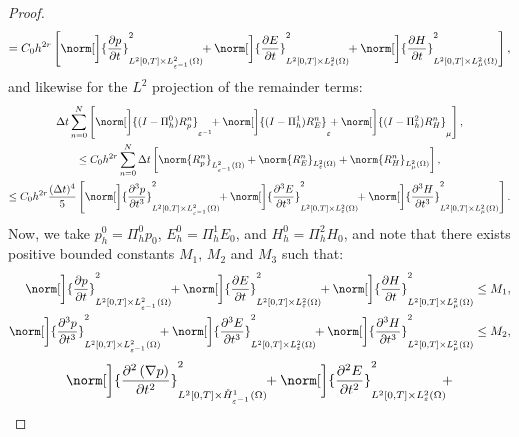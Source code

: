 \documentclass{amsart}
\theoremstyle{thmstyleone}%
\theoremstyle{thmstyletwo}%
\theoremstyle{thmstylethree}%
\begin{document}
\begin{proof}
\begin{multline*}
= C_0 h^{2 r} \left[ \norm[\bigg]{\dfrac{\partial p}{\partial t}}^2_{L^2[0, T] \times L^2_{\varepsilon^{-1}}(\Omega)} \!\! + \norm[\bigg]{\dfrac{\partial E}{\partial t}}^2_{L^2[0, T] \times L^2_{\varepsilon}(\Omega)} \!\! + \norm[\bigg]{\dfrac{\partial H}{\partial t}}^2_{L^2[0, T] \times L^2_{\mu}(\Omega)} \right],
\end{multline*}
and likewise for the $L^2$ projection of the remainder terms:
\begin{multline*}
  \Delta t \sum\limits_{n = 0}^N \left[ \norm[\bigg]{(I - \Pi_h^0) R_p^n}_{\varepsilon^{-1}} \!\! + \norm[\bigg]{(I - \Pi_h^1) R_E^n}_{\varepsilon} \!\! + \norm[\bigg]{(I - \Pi_h^2) R_H^n}_{\mu} \right], \\
  \le C_0 h^{2 r} \sum\limits_{n = 0}^N  \Delta t \left[ \norm{R_p^n}_{L^2_{\varepsilon^{-1}}(\Omega)} + \norm{R_E^n}_{L^2_{\varepsilon}(\Omega)} + \norm{R_H^n}_{L^2_{\mu}(\Omega)} \right], \\
  \le C_0 h^{2 r} \dfrac{(\Delta t)^4}{5} \left[ \norm[\bigg]{\dfrac{\partial^3 p}{\partial t^3}}^2_{L^2[0, T] \times L^2_{\varepsilon^{-1}}(\Omega)} \!\! + \norm[\bigg]{\dfrac{\partial^3 E}{\partial t^3}}^2_{L^2[0, T] \times L^2_{\varepsilon}(\Omega)} \!\! + \norm[\bigg]{\dfrac{\partial^3 H}{\partial t^3}}^2_{L^2[0, T] \times L^2_{\mu}(\Omega)} \right].
\end{multline*}
Now, we take $p_h^0 = \Pi_h^0 p_0$, $E_h^0 = \Pi_h^1 E_0$, and $H_h^0 = \Pi_h^2 H_0$, and note that there exists positive bounded constants $M_1, \, M_2$ and $M_3$ such that:
\begin{align*}
  \norm[\bigg]{\dfrac{\partial p}{\partial t}}^2_{L^2[0, T] \times L^2_{\varepsilon^{-1}}(\Omega)} \!\! + \norm[\bigg]{\dfrac{\partial E}{\partial t}}^2_{L^2[0, T] \times L^2_{\varepsilon}(\Omega)} \!\! + \norm[\bigg]{\dfrac{\partial H}{\partial t}}^2_{L^2[0, T] \times L^2_{\mu}(\Omega)} &\le M_1, \\
  \norm[\bigg]{\dfrac{\partial^3 p}{\partial t^3}}^2_{L^2[0, T] \times L^2_{\varepsilon^{-1}}(\Omega)} \!\! + \norm[\bigg]{\dfrac{\partial^3 E}{\partial t^3}}^2_{L^2[0, T] \times L^2_{\varepsilon}(\Omega)} \!\! + \norm[\bigg]{\dfrac{\partial^3 H}{\partial t^3}}^2_{L^2[0, T] \times L^2_{\mu}(\Omega)} &\le M_2,
\end{align*}
\vspace{-1em} \begin{multline*}
\norm[\bigg]{\dfrac{\partial^2 \left(\nabla p \right)}{\partial t^2}}^2_{L^2[0, T] \times \mathring{H}^1_{\varepsilon^{-1}}(\Omega)} \!\! + \norm[\bigg]{\dfrac{\partial^2 E}{\partial t^2}}^2_{L^2[0, T] \times L^2_\varepsilon(\Omega)} \!\! + \\

\end{multline*}
\end{proof}
\end{document}
